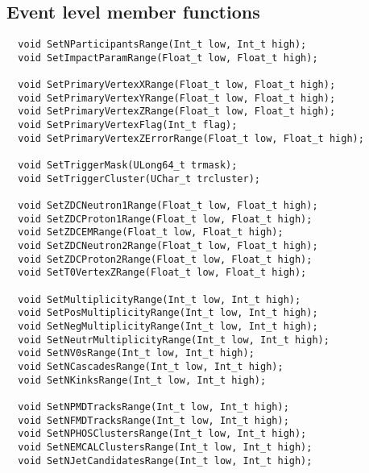 \subsection{Event level member functions}
{\ttfamily \noindent
\begin{verbatim}
  void SetNParticipantsRange(Int_t low, Int_t high);
  void SetImpactParamRange(Float_t low, Float_t high);

  void SetPrimaryVertexXRange(Float_t low, Float_t high);
  void SetPrimaryVertexYRange(Float_t low, Float_t high);
  void SetPrimaryVertexZRange(Float_t low, Float_t high);
  void SetPrimaryVertexFlag(Int_t flag);
  void SetPrimaryVertexZErrorRange(Float_t low, Float_t high);

  void SetTriggerMask(ULong64_t trmask);
  void SetTriggerCluster(UChar_t trcluster);

  void SetZDCNeutron1Range(Float_t low, Float_t high);
  void SetZDCProton1Range(Float_t low, Float_t high);
  void SetZDCEMRange(Float_t low, Float_t high);
  void SetZDCNeutron2Range(Float_t low, Float_t high);
  void SetZDCProton2Range(Float_t low, Float_t high);
  void SetT0VertexZRange(Float_t low, Float_t high);

  void SetMultiplicityRange(Int_t low, Int_t high);
  void SetPosMultiplicityRange(Int_t low, Int_t high);
  void SetNegMultiplicityRange(Int_t low, Int_t high);
  void SetNeutrMultiplicityRange(Int_t low, Int_t high);
  void SetNV0sRange(Int_t low, Int_t high);
  void SetNCascadesRange(Int_t low, Int_t high);
  void SetNKinksRange(Int_t low, Int_t high);

  void SetNPMDTracksRange(Int_t low, Int_t high);
  void SetNFMDTracksRange(Int_t low, Int_t high);
  void SetNPHOSClustersRange(Int_t low, Int_t high);
  void SetNEMCALClustersRange(Int_t low, Int_t high);
  void SetNJetCandidatesRange(Int_t low, Int_t high);


\end{verbatim}}
